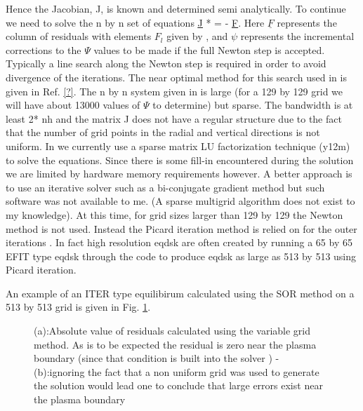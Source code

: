 Hence the Jacobian, J, is known and determined semi analytically. To continue we
need to solve the n by n set of equations
\beq \label{mhd:c}
 \underline{\underline{J}} * \underline{\psi} = - \underline{F}.
\eeq
Here $\underline{F} $ represents the column of residuals with elements $F_l$
given by , and $\psi$ represents the incremental corrections to
the $\Psi$ values to be made if the full Newton step is accepted. Typically a
line search along the Newton step is required in order to avoid divergence of
the iterations.  The near optimal method for this search used in \ot is given in
Ref. \ref{?}. The n by n system given in  is large (for a 129 by
129 grid we will have about 13000 values of $\Psi $ to determine) but sparse.
The bandwidth is at least 2* nh and the matrix J does not have a regular
structure due to the fact that the number of grid points in the radial and
vertical directions is not uniform. In \ot we currently use a sparse matrix LU
factorization technique (y12m)  to solve the equations. Since there is some 
fill-in encountered during the solution  we are limited by hardware memory
requirements however. A better approach is to use an iterative solver such as a
bi-conjugate gradient method but such software was not available to me. (A
sparse multigrid algorithm does  not exist to my knowledge). At this time, for
grid sizes larger than 129 by 129 the Newton method is not used. Instead the
Picard iteration method is relied on for the outer iterations . In fact high
resolution eqdsk are often created by running a 65 by 65 EFIT type  eqdsk
through the code to produce eqdsk as large  as 513 by 513 using Picard
iteration.

An example of an ITER type equilibirum calculated using the SOR method
on a 513 by 513 grid is given in Fig. \ref{fig:iter}.
\begin{figure}[hbtp] %
 \centering 
 \mbox{}
 \caption{(a):Absolute value of  residuals calculated using the variable grid
 method. As is to be expected the residual is zero near the plasma boundary
 (since that condition is built into the solver ) - (b):ignoring the fact that a
 non uniform grid was used to generate the solution would lead one to conclude
 that large errors exist near the plasma boundary} 
 \label{fig:iter}
\end{figure}

